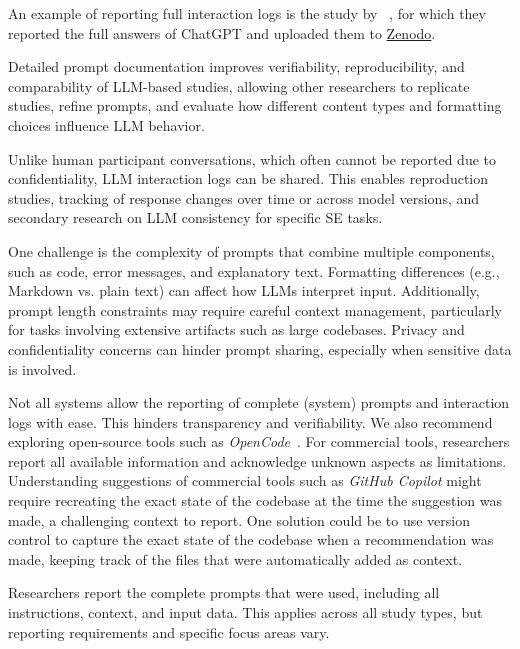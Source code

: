 An example of reporting full interaction logs is the study by \citeauthor{ronanki2023investigating}~\cite{ronanki2023investigating}, for which they reported the full answers of ChatGPT and uploaded them to \href{https://zenodo.org/records/8124936}{Zenodo}. 


Detailed prompt documentation improves verifiability, reproducibility, and comparability of LLM-based studies, allowing other researchers to replicate studies, refine prompts, and evaluate how different content types and formatting choices influence LLM behavior.

Unlike human participant conversations, which often cannot be reported due to confidentiality, LLM interaction logs can be shared. This enables reproduction studies, tracking of response changes over time or across model versions, and secondary research on LLM consistency for specific SE tasks.


One challenge is the complexity of prompts that combine multiple components, such as code, error messages, and explanatory text.
Formatting differences (e.g., Markdown vs. plain text) can affect how LLMs interpret input.
Additionally, prompt length constraints may require careful context management, particularly for tasks involving extensive artifacts such as large codebases.
Privacy and confidentiality concerns can hinder prompt sharing, especially when sensitive data is involved.

Not all systems allow the reporting of complete (system) prompts and interaction logs with ease.
This hinders transparency and verifiability.
We also recommend exploring open-source tools such as \emph{OpenCode}~\cite{opencode}.
For commercial tools, researchers \must report all available information and acknowledge unknown aspects as limitations.
Understanding suggestions of commercial tools such as \emph{GitHub Copilot} might require recreating the exact state of the codebase at the time the suggestion was made, a challenging context to report.
One solution could be to use version control to capture the exact state of the codebase when a recommendation was made, keeping track of the files that were automatically added as context.


Researchers \must report the complete prompts that were used, including all instructions, context, and input data. This applies across all study types, but reporting requirements and specific focus areas vary.

